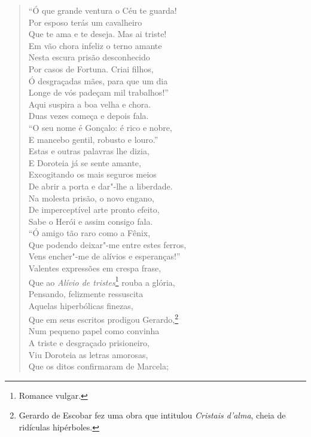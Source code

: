 \begin{verse}
``Ó que grande ventura o Céu te guarda!\\
Por esposo terás um cavalheiro\\
Que te ama e te deseja. Mas ai triste!\\
Em vão chora infeliz o terno amante\\
Nesta escura prisão desconhecido\\
Por casos de Fortuna. Criai filhos,\\			\index{\Fortu}
Ó desgraçadas mães, para que um dia\\
Longe de vós padeçam mil trabalhos!''\\
Aqui suspira a boa velha e chora.\\
Duas vezes começa e depois fala.\\
``O seu nome é Gonçalo: é rico e nobre,\\
E mancebo gentil, robusto e louro.''\\
Estas e outras palavras lhe dizia,\\
E Doroteia já se sente amante,\\
Excogitando os mais seguros meios\\
De abrir a porta e dar"-lhe a liberdade.\\
Na molesta prisão, o novo engano,\\
De imperceptível arte pronto efeito,\\
Sabe o Herói e assim consigo fala.\\
``Ó amigo tão raro como a Fênix,\\
Que podendo deixar"-me entre estes ferros,\\
Vens encher"-me de alívios e esperanças!''\\
Valentes expressões em crespa frase,\\
Que ao \textit{Alívio de tristes}\footnote{ Romance vulgar.} rouba a glória,\\		\index{\Romvulg}
Pensando, felizmente ressuscita\\
Aquelas hiperbólicas finezas,\\
Que em seus escritos prodigou Gerardo,\footnote{ Gerardo de Escobar fez
uma obra que intitulou \textit{Cristais d'alma}, cheia de ridículas
hipérboles.}\\ %
Num pequeno papel como convinha\\
A triste e desgraçado prisioneiro,\\
Viu Doroteia as letras amorosas,\\
Que os ditos confirmaram de Marcela;\\

\end{verse}
